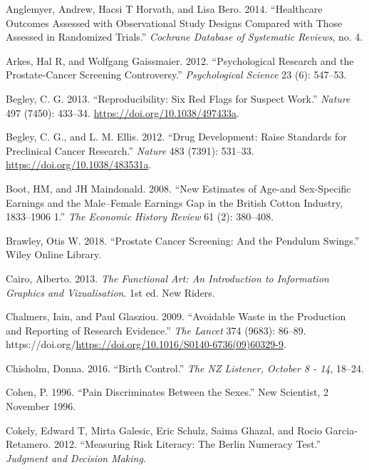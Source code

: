 \documentclass[
  10ptls,
  b5paper]{book}
\newlength{\cslhangindent}
\newenvironment{CSLReferences}[2] %
 {\begin{list}{}{%
  \setlength{\itemindent}{0pt}
  \setlength{\leftmargin}{0pt}
  \setlength{\parsep}{0pt}
  \ifodd #1
   \setlength{\leftmargin}{\cslhangindent}
   \setlength{\itemindent}{-1\cslhangindent}
  \fi
  \setlength{\itemsep}{#2\baselineskip}}}
 {\end{list}}
\begin{document}
\label{refs}
\begin{CSLReferences}{1}{0}
Anglemyer, Andrew, Hacsi T Horvath, and Lisa Bero. 2014. {``Healthcare Outcomes Assessed with Observational Study Designs Compared with Those Assessed in Randomized Trials.''} \emph{Cochrane Database of Systematic Reviews}, no. 4.

Arkes, Hal R, and Wolfgang Gaissmaier. 2012. {``Psychological Research and the Prostate-Cancer Screening Controversy.''} \emph{Psychological Science} 23 (6): 547--53.

Begley, C. G. 2013. {``Reproducibility: Six Red Flags for Suspect Work.''} \emph{Nature} 497 (7450): 433--34. \url{https://doi.org/10.1038/497433a}.

Begley, C. G., and L. M. Ellis. 2012. {``Drug Development: Raise Standards for Preclinical Cancer Research.''} \emph{Nature} 483 (7391): 531--33. \url{https://doi.org/10.1038/483531a}.

Boot, HM, and JH Maindonald. 2008. {``New Estimates of Age-and Sex-Specific Earnings and the Male--Female Earnings Gap in the British Cotton Industry, 1833--1906 1.''} \emph{The Economic History Review} 61 (2): 380--408.

Brawley, Otis W. 2018. {``Prostate Cancer Screening: And the Pendulum Swings.''} Wiley Online Library.

Cairo, Alberto. 2013. \emph{The Functional Art: An Introduction to Information Graphics and Vizualisation}. 1st ed. New Riders.

Chalmers, Iain, and Paul Glasziou. 2009. {``Avoidable Waste in the Production and Reporting of Research Evidence.''} \emph{The Lancet} 374 (9683): 86--89. https://doi.org/\url{https://doi.org/10.1016/S0140-6736(09)60329-9}.

Chisholm, Donna. 2016. {``Birth Control.''} \emph{The NZ Listener, October 8 - 14}, 18--24.

Cohen, P. 1996. {``Pain Discriminates Between the Sexes.''} New Scientist, 2 November 1996.

Cokely, Edward T, Mirta Galesic, Eric Schulz, Saima Ghazal, and Rocio Garcia-Retamero. 2012. {``Measuring Risk Literacy: The Berlin Numeracy Test.''} \emph{Judgment and Decision Making}.


\end{CSLReferences}
\end{document}
